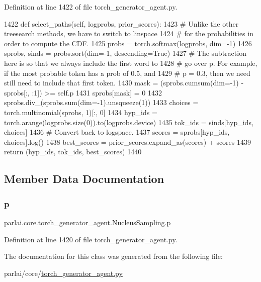 Definition at line 1422 of file torch\+\_\+generator\+\_\+agent.\+py.


\begin{DoxyCode}
1422     \textcolor{keyword}{def }select\_paths(self, logprobs, prior\_scores):
1423         \textcolor{comment}{# Unlike the other treesearch methods, we have to switch to linspace}
1424         \textcolor{comment}{# for the probabilities in order to compute the CDF.}
1425         probs = torch.softmax(logprobs, dim=-1)
1426         sprobs, sinds = probs.sort(dim=-1, descending=\textcolor{keyword}{True})
1427         \textcolor{comment}{# The subtraction here is so that we always include the first word to}
1428         \textcolor{comment}{# go over p. For example, if the most probable token has a prob of 0.5, and}
1429         \textcolor{comment}{# p = 0.3, then we need still need to include that first token.}
1430         mask = (sprobs.cumsum(dim=-1) - sprobs[:, :1]) >= self.p
1431         sprobs[mask] = 0
1432         sprobs.div\_(sprobs.sum(dim=-1).unsqueeze(1))
1433         choices = torch.multinomial(sprobs, 1)[:, 0]
1434         hyp\_ids = torch.arange(logprobs.size(0)).to(logprobs.device)
1435         tok\_ids = sinds[hyp\_ids, choices]
1436         \textcolor{comment}{# Convert back to logspace.}
1437         scores = sprobs[hyp\_ids, choices].log()
1438         best\_scores = prior\_scores.expand\_as(scores) + scores
1439         \textcolor{keywordflow}{return} (hyp\_ids, tok\_ids, best\_scores)
1440 \end{DoxyCode}


\subsection{Member Data Documentation}
\mbox{\label{classparlai_1_1core_1_1torch__generator__agent_1_1NucleusSampling_a54a43b58e2e2cf7da776c40311e0a3c1}} 
\subsubsection{\texorpdfstring{p}{p}}
{\footnotesize\ttfamily parlai.\+core.\+torch\+\_\+generator\+\_\+agent.\+Nucleus\+Sampling.\+p}



Definition at line 1420 of file torch\+\_\+generator\+\_\+agent.\+py.



The documentation for this class was generated from the following file\+:\begin{DoxyCompactItemize}
\item 
parlai/core/\hyperlink{torch__generator__agent_8py}{torch\+\_\+generator\+\_\+agent.\+py}\end{DoxyCompactItemize}
